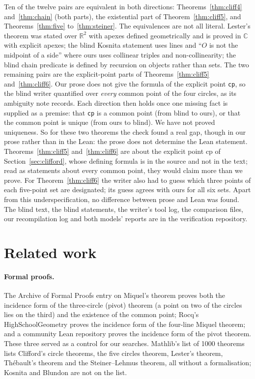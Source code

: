 \documentclass[11pt]{article}
\theoremstyle{definition}
\theoremstyle{remark}
\newcommand{\lean}[1]{\texttt{#1}}
\begin{document}
Ten of the twelve pairs are equivalent in both directions: Theorems~\ref{thm:cliff4} and~\ref{thm:chain}
(both parts), the existential part of Theorem~\ref{thm:cliff5}, and Theorems~\ref{thm:five}
to~\ref{thm:steiner}. The equivalences are not all literal. Lester's theorem was stated over
$\mathbb{R}^2$ with apexes defined geometrically and is proved in $\mathbb{C}$ with explicit apexes; the
blind Kosnita statement uses lines and ``$O$ is not the midpoint of a side'' where ours uses collinear
triples and non-collinearity; the blind chain predicate is defined by recursion on objects rather than
sets. The two remaining pairs are the explicit-point parts of Theorems~\ref{thm:cliff5}
and~\ref{thm:cliff6}. Our prose does not give the formula of the explicit point \lean{cp}, so the blind
writer quantified over \emph{every} common point of the four circles, as its ambiguity note records.
Each direction then holds once one missing fact is supplied as a premise: that \lean{cp} is a common
point (from blind to ours), or that the common point is unique (from ours to blind). We have not proved
uniqueness. So for these two theorems the check found a real gap, though in our prose rather than in
the Lean: the prose does not determine the Lean statement. Theorems~\ref{thm:cliff5} and~\ref{thm:cliff6}
are about the explicit point $\mathrm{cp}$ of Section~\ref{sec:clifford}, whose defining formula is in
the source and not in the text; read as statements about every common point, they would claim more than
we prove. For Theorem~\ref{thm:cliff6} the writer also had to guess which three points of each
five-point set are designated; its guess agrees with ours for all six sets. Apart from this
underspecification, no difference between prose and Lean was found. The blind text, the blind
statements, the writer's tool log, the comparison files, our recompilation log and both models' reports
are in the verification repository.

\section{Related work}\label{sec:related}

\paragraph{Formal proofs.} The Archive of Formal Proofs entry on Miquel's theorem \cite{afpmiquel} proves both the incidence
form of the three-circle (pivot) theorem (a point on two of the circles lies on the third) and the
existence of the common point; Rocq's HighSchoolGeometry \cite{hsgeometry} proves the incidence form of
the four-line Miquel theorem; and a community Lean repository \cite{leangenius} proves the incidence
form of the pivot theorem. These three served as a control for our searches.
Mathlib's list of 1000 theorems \cite{mathlib1000} lists Clifford's circle theorems, the five circles
theorem, Lester's theorem, Th\'ebault's theorem and the Steiner--Lehmus theorem, all without a
formalisation; Kosnita and Blundon are not on the list.
\end{document}
